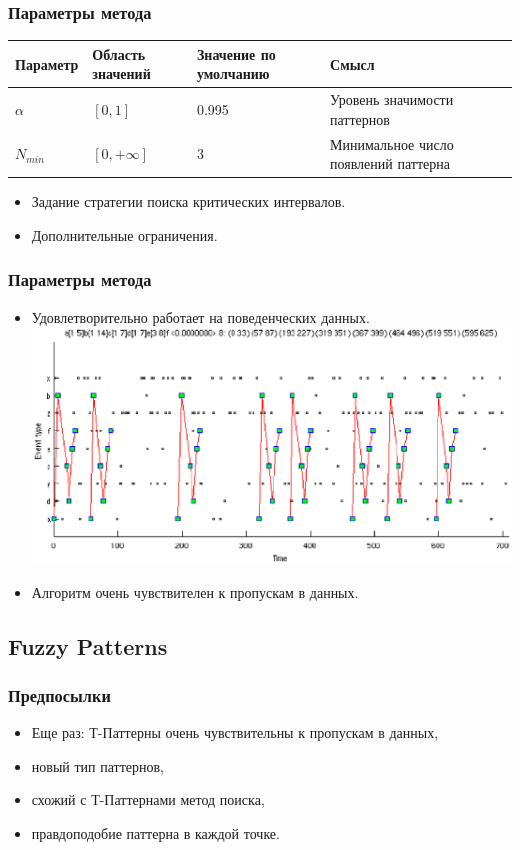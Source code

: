 \documentclass[smaller]{beamer}
\begin{document}
\begin{frame}	
  \frametitle{Параметры метода}
 \begin{tabular}{ |p{5em} | p{4em} | p{4em} | p{8em}| }
    
    \hline
    \bf{Параметр} & \bf{ Область значений} & \bf{ Значение по умолчанию} & \bf{ Смысл } \\
    \hline
    $\alpha$ & $[0,1]$ & 0.995 & Уровень значимости паттернов \\ \hline
    $N_{min}$ & $[0, +\infty]$ & 3 & Минимальное число появлений паттерна  \\ \hline
  \end{tabular}
  \begin{itemize}
    \item Задание стратегии поиска критических интервалов.
    \item Дополнительные ограничения.
  \end{itemize}
\end{frame}

\begin{frame}	
  \frametitle{Параметры метода}
 \begin{itemize}
    \item Удовлетворительно работает на поведенческих данных.
    \\ \includegraphics[scale=0.50]{resultex.eps} 
    \item Алгоритм очень чувствителен к пропускам в данных.
  \end{itemize}
\end{frame}

\subsection{Fuzzy Patterns}
\begin{frame}
  \frametitle{Предпосылки}
  \begin{itemize}
  \item Еще раз: Т-Паттерны очень чувствительны к пропускам в данных,
  \item новый тип паттернов, 
  \item схожий с Т-Паттернами метод поиска,
  \item правдоподобие паттерна в каждой точке.
   \end{itemize}
\end{frame}
\end{document}

